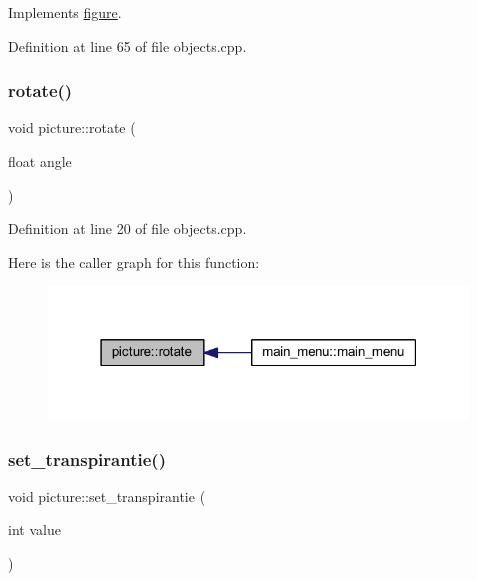 Implements \hyperlink{classfigure_aca9a3924bc0883e1aa8e93c04887abbc}{figure}.



Definition at line 65 of file objects.\+cpp.

\mbox{\label{classpicture_a98bd5bdea80247573c1b155a5df5bea2}} 
\subsubsection{\texorpdfstring{rotate()}{rotate()}}
{\footnotesize\ttfamily void picture\+::rotate (\begin{DoxyParamCaption}\item[{float}]{angle }\end{DoxyParamCaption})}



Definition at line 20 of file objects.\+cpp.

Here is the caller graph for this function\+:
\nopagebreak
\begin{figure}[H]
\begin{center}
\leavevmode
\includegraphics[width=316pt]{classpicture_a98bd5bdea80247573c1b155a5df5bea2_icgraph}
\end{center}
\end{figure}
\mbox{\label{classpicture_a4222d8d8a5be3d0775b741049064714f}} 
\subsubsection{\texorpdfstring{set\+\_\+transpirantie()}{set\_transpirantie()}}
{\footnotesize\ttfamily void picture\+::set\+\_\+transpirantie (\begin{DoxyParamCaption}\item[{int}]{value }\end{DoxyParamCaption})}



